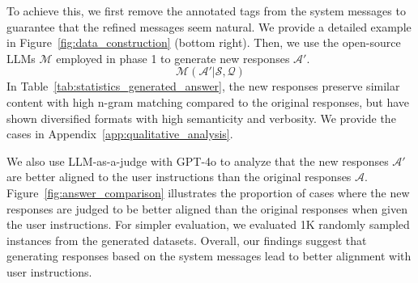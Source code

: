 To achieve this, we first remove the annotated tags from the system messages to guarantee that the refined messages seem natural.
We provide a detailed example in Figure~\ref{fig:data_construction} (bottom right).
Then, we use the open-source LLMs $\mathcal{M}$ employed in phase 1 to generate new responses $\mathcal{A'}$.
\begin{equation}
    \mathcal{M}(\mathcal{A'}|\mathcal{S},\mathcal{Q})
\end{equation}
In Table~\ref{tab:statistics_generated_answer}, the new responses preserve similar content with high n-gram matching compared to the original responses, but have shown diversified formats with high semanticity and verbosity.
We provide the cases in Appendix~\ref{app:qualitative_analysis}.



We also use LLM-as-a-judge with GPT-4o to analyze that the new responses $\mathcal{A'}$ are better aligned to the user instructions than the original responses $\mathcal{A}$.
Figure~\ref{fig:answer_comparison} illustrates the proportion of cases where the new responses are judged to be better aligned than the original responses when given the user instructions.
For simpler evaluation, we evaluated 1K randomly sampled instances from the generated datasets.
Overall, our findings suggest that generating responses based on the system messages lead to better alignment with user instructions.
